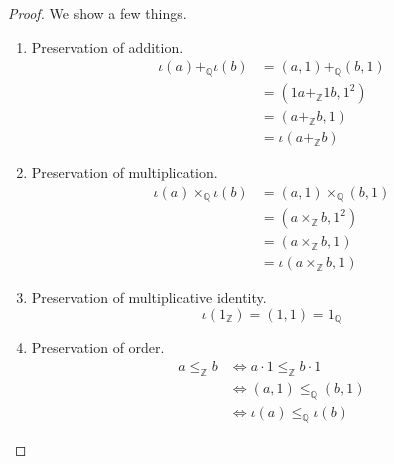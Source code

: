   \begin{proof} 
    We show a few things. 
    \begin{enumerate}
      \item Preservation of addition. 
        \begin{align}
          \iota(a) +_{\mathbb{Q}} \iota(b) & = (a, 1) +_{\mathbb{Q}} (b, 1) \\
                                           & = (1a +_{\mathbb{Z}} 1b, 1^2) \\
                                           & = (a +_{\mathbb{Z}} b, 1) \\
                                           & = \iota(a +_{\mathbb{Z}} b) 
        \end{align}
      \item Preservation of multiplication. 
        \begin{align}
          \iota(a) \times_{\mathbb{Q}} \iota(b) & = (a, 1) \times_{\mathbb{Q}} (b, 1) \\
                                                & = (a \times_{\mathbb{Z}} b, 1^2) \\
                                                & = (a \times_{\mathbb{Z}} b, 1) \\
                                                & = \iota(a \times_{\mathbb{Z}} b, 1)
        \end{align}
      \item Preservation of multiplicative identity. 
        \begin{equation}
          \iota(1_{\mathbb{Z}}) = (1, 1) = 1_{\mathbb{Q}}
        \end{equation}

      \item Preservation of order. 
      \begin{align}
        a \leq_{\mathbb{Z}} b & \iff a \cdot 1 \leq_{\mathbb{Z}} b \cdot 1 \\
                              & \iff (a, 1) \leq_{\mathbb{Q}} (b, 1) \\
                              & \iff \iota(a) \leq_{\mathbb{Q}} \iota(b)
      \end{align}
    \end{enumerate}
  \end{proof} 

